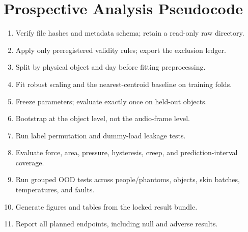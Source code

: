 \documentclass[10pt]{article}
\begin{document}
\section{Prospective Analysis Pseudocode}
\begin{enumerate}
\item Verify file hashes and metadata schema; retain a read-only raw directory.
\item Apply only preregistered validity rules; export the exclusion ledger.
\item Split by physical object and day before fitting preprocessing.
\item Fit robust scaling and the nearest-centroid baseline on training folds.
\item Freeze parameters; evaluate exactly once on held-out objects.
\item Bootstrap at the object level, not the audio-frame level.
\item Run label permutation and dummy-load leakage tests.
\item Evaluate force, area, pressure, hysteresis, creep, and prediction-interval coverage.
\item Run grouped OOD tests across people/phantoms, objects, skin batches, temperatures, and faults.
\item Generate figures and tables from the locked result bundle.
\item Report all planned endpoints, including null and adverse results.
\end{enumerate}
\end{document}

